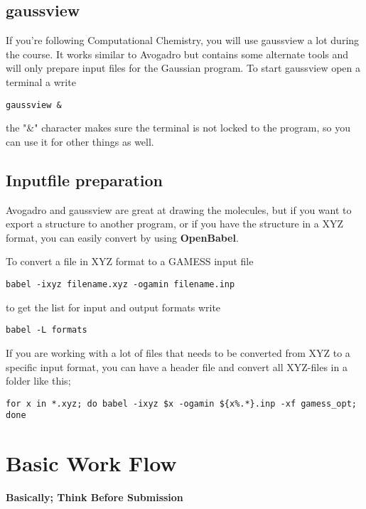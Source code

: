 \documentclass{article}
\begin{document}
\subsection*{gaussview}

If you're following Computational Chemistry, you will use gaussview a lot during the course.
It works similar to Avogadro but contains some alternate tools and will only prepare input files for the Gaussian program.
To start gaussview open a terminal a write
\begin{lstlisting}
gaussview &
\end{lstlisting}

the "\&" character makes sure the terminal is not locked to the program, so you can use it for other things as well.


\subsection*{Inputfile preparation}

Avogadro and gaussview are great at drawing the molecules, but if you want to export a structure to another program, or if you have the structure in a XYZ format, you can easily convert by using {\bf OpenBabel}.

To convert a file in XYZ format to a GAMESS input file
\begin{lstlisting}
babel -ixyz filename.xyz -ogamin filename.inp
\end{lstlisting}

to get the list for input and output formats write

\begin{lstlisting}
babel -L formats
\end{lstlisting}

If you are working with a lot of files that needs to be converted from XYZ to a specific input format, you can have a header file  and convert all XYZ-files in a folder like this;

\begin{lstlisting}
for x in *.xyz; do babel -ixyz $x -ogamin ${x%.*}.inp -xf gamess_opt; done
\end{lstlisting}

\newpage
\section{Basic Work Flow}

\begin{center}
\bf Basically; Think Before Submission
\end{center}
\end{document}

